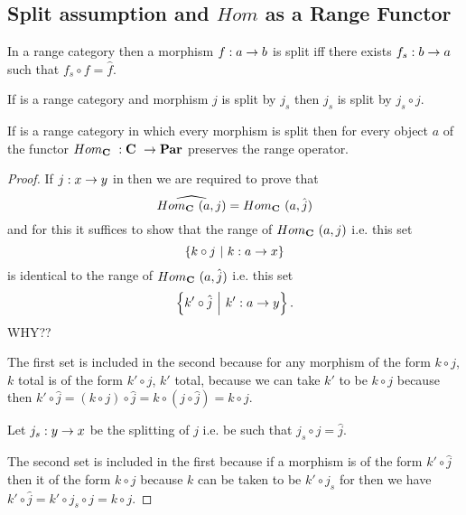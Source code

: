 \documentclass[10pt,a4paper]{article}
\theoremstyle{remark}
\begin{document}
\subsection{Split assumption and $Hom$ as a Range Functor}
\begin{definition}
In a range category \catcw then a morphism $f:a \rightarrow b$ is split iff
there exists $f_s:b \rightarrow a$ such that $f_s \circ f = \hat{f}$.
\end{definition}
\begin{lemma}
If \catcw is a range category and morphism $j$ is split by $j_s$ then $j_s$ is split by
$\hat{j_s}\circ j$.
\end{lemma}
\begin{lemma}
If \catcw is a range category in which every morphism is split then
for every object $a$ of \catcw the functor $Hom_{\textbf{C}}\ : \textbf{C}\  \rightarrow \textbf{Par}$ preserves the range operator.
\end{lemma}
\begin{proof}
If $j: x \rightarrow y$ in \catcw then we are required to prove that
$$\widehat{Hom_{\textbf{C}}\ (a,j)}=Hom_{\textbf{C}}\ (a,\hat{j})$$
and for this it suffices to show that the range of $Hom_{\textbf{C}}\ (a,j)$ i.e. this set
$$\left\{ k \circ j \ \middle|\ k: a \rightarrow x \right\}$$ 
is identical to the range of $Hom_{\textbf{C}}\ (a,\hat{j})$ i.e. this set
$$\left\{k' \circ \hat{j} \ \middle|\ k':a \rightarrow y\right\}.$$   WHY??

The first set is included in the second because for any morphism of the form $k \circ j$, $k$ total is of the form $k' \circ j$, $k'$ total, because we can take $k'$ to be $k \circ j$ because then $k' \circ \hat{j} = (k \circ j) \circ \hat{j}= k \circ(j \circ \hat{j})= k \circ j$. 

Let $j_s : y \rightarrow x$ be the splitting of $j$ i.e. be such that $j_s \circ j = \hat{j}$.

The second set is included in the first because if a morphism is of the form $k' \circ \hat{j}$ then it of the form $k \circ j$ because $k$ can be taken to be $k' \circ j_s$ for then we have $k' \circ \hat{j} = k' \circ j_s \circ j = k \circ j$. 
 \end{proof}
\end{document}
